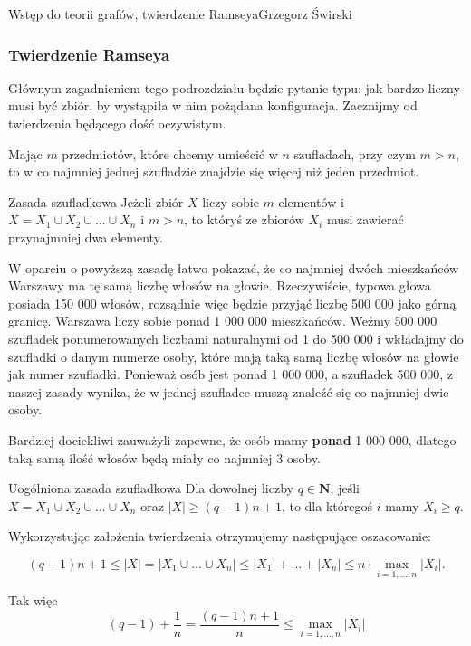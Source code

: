 \begin{referat}{Wstęp do teorii grafów, twierdzenie Ramseya}{Grzegorz Świrski}
\begin{teoria}
\subsubsection{Twierdzenie Ramseya}
Głównym zagadnieniem tego podrozdziału będzie pytanie typu: jak bardzo liczny musi być zbiór, by wystąpiła w nim pożądana konfiguracja. Zacznijmy od twierdzenia będącego dość oczywistym.

Mając $m$ przedmiotów, które chcemy umieścić w $n$ szufladach, przy czym $m > n$, to w co najmniej jednej szufladzie znajdzie się więcej niż jeden przedmiot.

\begin{twierdzenie}{Zasada szufladkowa}
Jeżeli zbiór $X$ liczy sobie $m$ elementów i $X = X_{1} \cup X_{2} \cup... \cup X_{n}$ i $m > n$, to któryś ze zbiorów $X_{i}$ musi zawierać przynajmniej dwa elementy.
\end{twierdzenie}

W oparciu o powyższą zasadę łatwo pokazać, że co najmniej dwóch mieszkańców Warszawy ma tę samą liczbę włosów na głowie. Rzeczywiście, typowa głowa posiada 150 000 włosów, rozsądnie więc będzie przyjąć liczbę 500 000 jako górną granicę. Warszawa liczy sobie ponad 1 000 000 mieszkańców. Weźmy 500 000 szufladek ponumerowanych liczbami naturalnymi od 1 do 500 000 i wkładajmy do szufladki o danym numerze osoby, które mają taką samą liczbę włosów na głowie jak numer szufladki. Ponieważ osób jest ponad 1 000 000, a szufladek 500 000, z naszej zasady wynika, że w jednej szufladce muszą znaleźć się co najmniej dwie osoby.

Bardziej dociekliwi zauważyli zapewne, że osób mamy \textbf{ponad} 1 000 000, dlatego taką samą ilość włosów będą miały co najmniej 3 osoby.

\begin{twierdzenie}{Uogólniona zasada szufladkowa}
Dla dowolnej liczby $q \in \mathbf{N}$, jeśli $X = X_{1} \cup X_{2} \cup... \cup X_{n}$ oraz $|X| \geq (q-1)n + 1$, to dla któregoś $i$ mamy $X_{i} \geq q$.
\end{twierdzenie}

\begin{dowod}
Wykorzystując założenia twierdzenia otrzymujemy następujące oszacowanie:

$$(q-1)n+1\leq\left\vert X \right\vert =\left\vert X_1\cup\ldots\cup X_n \right\vert \leq\left\vert X_1 \right\vert+\ldots+\left\vert X_n \right\vert \leq n\cdot \max_{i=1,\ldots, n}{\left\vert X_i \right\vert}.$$

Tak więc
$$(q-1)+\frac{1}{n}=\frac{(q-1)n+1}{n}\leq\max_{i=1,\ldots, n}{\left\vert X_i \right\vert}$$


\end{dowod}
\end{teoria}
\end{referat}
